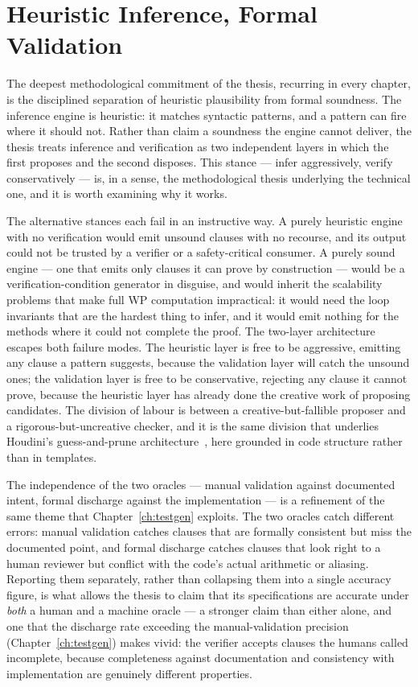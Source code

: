 \section{Heuristic Inference, Formal Validation}
\label{sec:syn-heuristic}

The deepest methodological commitment of the thesis, recurring in every chapter,
is the disciplined separation of heuristic plausibility from formal soundness.
The inference engine is heuristic: it matches syntactic patterns, and a pattern
can fire where it should not. Rather than claim a soundness the engine cannot
deliver, the thesis treats inference and verification as two independent layers
in which the first proposes and the second disposes. This stance --- infer
aggressively, verify conservatively --- is, in a sense, the methodological
thesis underlying the technical one, and it is worth examining why it works.

The alternative stances each fail in an instructive way. A purely heuristic
engine with no verification would emit unsound clauses with no recourse, and its
output could not be trusted by a verifier or a safety-critical consumer. A purely
sound engine --- one that emits only clauses it can prove by construction ---
would be a verification-condition generator in disguise, and would inherit the
scalability problems that make full WP computation impractical: it would need the
loop invariants that are the hardest thing to infer, and it would emit nothing
for the methods where it could not complete the proof. The two-layer
architecture escapes both failure modes. The heuristic layer is free to be
aggressive, emitting any clause a pattern suggests, because the validation layer
will catch the unsound ones; the validation layer is free to be conservative,
rejecting any clause it cannot prove, because the heuristic layer has already
done the creative work of proposing candidates. The division of labour is
between a creative-but-fallible proposer and a rigorous-but-uncreative checker,
and it is the same division that underlies Houdini's guess-and-prune
architecture~\cite{flanagan2001houdini}, here grounded in code structure rather
than in templates.

The independence of the two oracles --- manual validation against documented
intent, formal discharge against the implementation --- is a refinement of the
same theme that Chapter~\ref{ch:testgen} exploits. The two oracles catch
different errors: manual validation catches clauses that are formally consistent
but miss the documented point, and formal discharge catches clauses that look
right to a human reviewer but conflict with the code's actual arithmetic or
aliasing. Reporting them separately, rather than collapsing them into a single
accuracy figure, is what allows the thesis to claim that its specifications are
accurate under \emph{both} a human and a machine oracle --- a stronger claim than
either alone, and one that the discharge rate exceeding the manual-validation
precision (Chapter~\ref{ch:testgen}) makes vivid: the verifier accepts clauses
the humans called incomplete, because completeness against documentation and
consistency with implementation are genuinely different properties.

